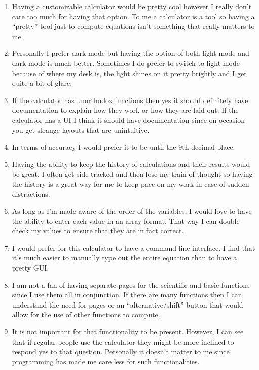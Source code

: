 \documentclass[titlepage]{article}
\begin{document}
\begin{itemize}
\begin{enumerate}
                            \item Having a customizable calculator would be pretty cool however I really don’t care too much for having that option. To me a calculator is a tool so having a “pretty” tool just to compute equations isn’t something that really matters to me.
                            \item Personally I prefer dark mode but having the option of both light mode and dark mode is much better. Sometimes I do prefer to switch to light mode because of where my desk is, the light shines on it pretty brightly and I get quite a bit of glare.
                            \item If the calculator has unorthodox functions then yes it should definitely have documentation to explain how they work or how they are laid out. If the calculator has a UI I think it should have documentation since on occasion you get strange layouts that are unintuitive.
                            \item In terms of accuracy I would prefer it to be until the 9th decimal place.
                            \item Having the ability to keep the history of calculations and their results would be great. I often get side tracked and then lose my train of thought so having the history is a great way for me to keep pace on my work in case of sudden distractions.
                            \item As long as I’m made aware of the order of the variables, I would love to have the ability to enter each value in an array format. That way I can double check my values to ensure that they are in fact correct.
                            \item I would prefer for this calculator to have a command line interface. I find that it’s much easier to manually type out the entire equation than to have a pretty GUI.
                            \item I am not a fan of having separate pages for the scientific and basic functions since I use them all in conjunction. If there are many functions then I can understand the need for pages or an “alternative/shift” button that would allow for the use of other functions to compute.
                            \item It is not important for that functionality to be present. However, I can see that if regular people use the calculator they might be more inclined to respond yes to that question. Personally it doesn’t matter to me since programming has made me care less for such functionalities.

\end{enumerate}
\end{itemize}
\end{document}
